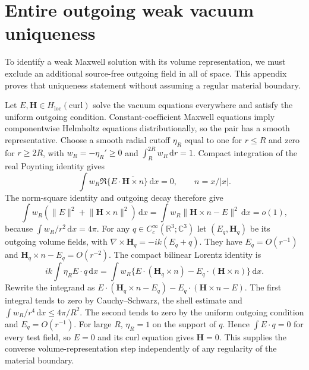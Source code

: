 \documentclass[11pt]{article}
\newcommand{\dd}{\,\mathrm{d}}
\newcommand{\norm}[1]{\lVert #1\rVert}
\newcommand{\abs}[1]{\lvert #1\rvert}
\begin{document}
\appendix
\section{Entire outgoing weak vacuum uniqueness}\label{app:vacuum}
To identify a weak Maxwell solution with its volume representation, we must exclude an additional source-free outgoing field in all of space. This appendix proves that uniqueness statement without assuming a regular material boundary.

Let $E,\mathbf H\in H_{\mathrm{loc}}(\mathrm{curl})$ solve the vacuum equations everywhere and satisfy the uniform outgoing condition. Constant-coefficient Maxwell equations imply componentwise Helmholtz equations distributionally, so the pair has a smooth representative. Choose a smooth radial cutoff $\eta_R$ equal to one for $r\leq R$ and zero for $r\geq2R$, with $w_R=-\eta_R'\geq0$ and $\int_R^{2R}w_R\dd r=1$. Compact integration of the real Poynting identity gives
\[
 \int w_R\Re\{E\cdot\overline{\mathbf H\times n}\}\dd x=0,
 \qquad n=x/\abs x.
\]
The norm-square identity and outgoing decay therefore give
\[
 \int w_R(\norm E^2+\norm{\mathbf H\times n}^2)\dd x
 =\int w_R\norm{\mathbf H\times n-E}^2\dd x=o(1),
\]
because $\int w_R/r^2\dd x=4\pi$. For any $q\in C_c^\infty(\mathbb R^3;\mathbb C^3)$ let $(E_q,\mathbf H_q)$ be its outgoing volume fields, with $\nabla\times\mathbf H_q=-ik(E_q+q)$. They have $E_q=O(r^{-1})$ and $\mathbf H_q\times n-E_q=O(r^{-2})$. The compact bilinear Lorentz identity is
\[
 ik\int\eta_RE\cdot q\dd x
 =\int w_R\{E\cdot(\mathbf H_q\times n)-E_q\cdot(\mathbf H\times n)\}\dd x.
\]
Rewrite the integrand as $E\cdot(\mathbf H_q\times n-E_q)-E_q\cdot(\mathbf H\times n-E)$. The first integral tends to zero by Cauchy--Schwarz, the shell estimate and $\int w_R/r^4\dd x\leq4\pi/R^2$. The second tends to zero by the uniform outgoing condition and $E_q=O(r^{-1})$. For large $R$, $\eta_R=1$ on the support of $q$. Hence $\int E\cdot q=0$ for every test field, so $E=0$ and its curl equation gives $\mathbf H=0$. This supplies the converse volume-representation step independently of any regularity of the material boundary.



\end{document}
